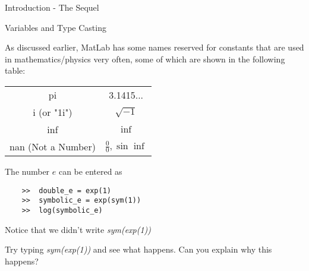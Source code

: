 \documentclass[11pt, oneside]{report}   	%
\begin{document}
\begin{chapter}{Introduction - The Sequel}
\begin{section}{Variables and Type Casting}
\begin{Exercise}
\end{Exercise}

As discussed earlier, MatLab has some names reserved for constants that are used in mathematics/physics very
often, some of which are shown in the following table:
\begin{center}
\begin{tabular}{ | c | c | }
pi & 3.1415...  \\
i (or "1i") & $\sqrt{-1}$ \\
inf & $\inf$ \\
nan (Not a Number) & $\frac{0}{0}, \sin{\inf}$
\end{tabular}
\end{center}

The number $e$ can be entered as

\begin{lstlisting}
	>>	double_e = exp(1)
	>>	symbolic_e = exp(sym(1))
	>>	log(symbolic_e)
\end{lstlisting}
Notice that we didn't write \textit{sym(exp(1))}

\begin{Exercise}
Try typing \textit{sym(exp(1))} and see what happens. Can you explain why this happens?
\end{Exercise}

\end{section}


\end{chapter}
\end{document}

